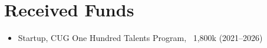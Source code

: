 \section*{Received Funds}

\begin{itemize}
\item Startup, CUG One Hundred Talents Program, \textyen\ 1,800k (2021--2026)
\end{itemize}
